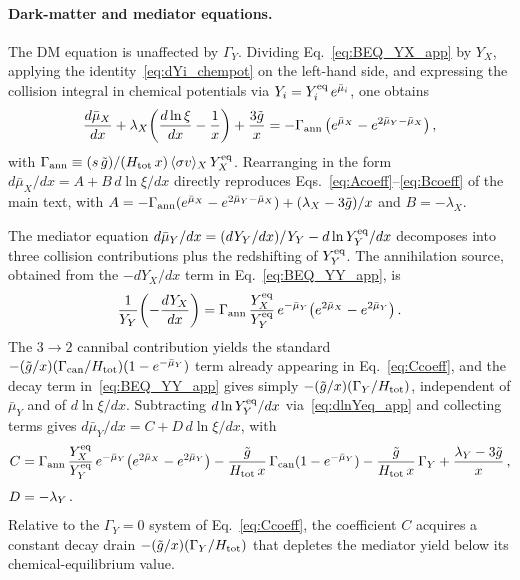 \documentclass[11pt]{article}
\numberwithin{equation}{section}
\newcommand{\sigmav}{\langle\sigma v\rangle}
\begin{document}
\paragraph{Dark-matter and mediator equations.}
 
The DM equation is unaffected by $\Gamma_Y$. Dividing Eq.~\eqref{eq:BEQ_YX_app} by $Y_X$, applying the identity~\eqref{eq:dYi_chempot} on the left-hand side, and expressing the collision integral in chemical potentials via $Y_i = Y_i^{\rm eq}\,e^{\bar\mu_i}$, one obtains
\begin{equation}
  \frac{d\bar\mu_X}{dx} + \lambda_X\!\left(\frac{d\ln\xi}{dx} - \frac{1}{x}\right) + \frac{3\tilde g}{x}
  = -\Gamma_{\rm ann}\left(e^{\bar\mu_X} - e^{2\bar\mu_Y - \bar\mu_X}\right),
\end{equation}
with $\Gamma_{\rm ann} \equiv (s\,\tilde g)/(H_{\rm tot}\,x)\,\sigmav_X\,Y_X^{\rm eq}$. Rearranging in the form $d\bar\mu_X/dx = A + B\,d\ln\xi/dx$ directly reproduces Eqs.~\eqref{eq:Acoeff}--\eqref{eq:Bcoeff} of the main text, with $A = -\Gamma_{\rm ann}(e^{\bar\mu_X} - e^{2\bar\mu_Y - \bar\mu_X}) + (\lambda_X - 3\tilde g)/x$ and $B = -\lambda_X$.
 
The mediator equation $d\bar\mu_Y/dx = (dY_Y/dx)/Y_Y - d\ln Y_Y^{\rm eq}/dx$ decomposes into three collision contributions plus the redshifting of $Y_Y^{\rm eq}$. The annihilation source, obtained from the $-dY_X/dx$ term in Eq.~\eqref{eq:BEQ_YY_app}, is
\begin{equation}
  \frac{1}{Y_Y}\!\left(-\frac{dY_X}{dx}\right) = \Gamma_{\rm ann}\,\frac{Y_X^{\rm eq}}{Y_Y^{\rm eq}}\,e^{-\bar\mu_Y}\!\left(e^{2\bar\mu_X} - e^{2\bar\mu_Y}\right).
\end{equation}
The $3\to 2$ cannibal contribution yields the standard $-(\tilde g/x)(\Gamma_{\rm can}/H_{\rm tot})(1 - e^{-\bar\mu_Y})$ term already appearing in Eq.~\eqref{eq:Ccoeff}, and the decay term in~\eqref{eq:BEQ_YY_app} gives simply $-(\tilde g/x)(\Gamma_Y/H_{\rm tot})$, independent of $\bar\mu_Y$ and of $d\ln\xi/dx$. Subtracting $d\ln Y_Y^{\rm eq}/dx$ via~\eqref{eq:dlnYeq_app} and collecting terms gives $d\bar\mu_Y/dx = C + D\,d\ln\xi/dx$, with
\begin{align}
  C &= \Gamma_{\rm ann}\,\frac{Y_X^{\rm eq}}{Y_Y^{\rm eq}}\,e^{-\bar\mu_Y}\!\left(e^{2\bar\mu_X} - e^{2\bar\mu_Y}\right) - \frac{\tilde g}{H_{\rm tot}\,x}\,\Gamma_{\rm can}(1 - e^{-\bar\mu_Y}) - \frac{\tilde g}{H_{\rm tot}\,x}\,\Gamma_Y + \frac{\lambda_Y - 3\tilde g}{x}\,, \label{eq:C_app}\\[4pt]
  D &= -\lambda_Y\,.
\end{align}
Relative to the $\Gamma_Y = 0$ system of Eq.~\eqref{eq:Ccoeff}, the coefficient $C$ acquires a constant decay drain $-(\tilde g/x)(\Gamma_Y/H_{\rm tot})$ that depletes the mediator yield below its chemical-equilibrium value.
 
\end{document}

